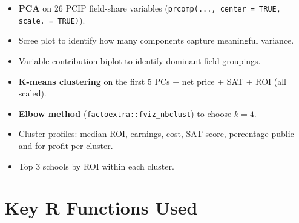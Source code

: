 \documentclass[12pt, letterpaper]{article}
\begin{document}
\begin{itemize}
  \item \textbf{PCA} on 26 PCIP field-share variables (\texttt{prcomp(..., center = TRUE, scale. = TRUE)}).
  \item Scree plot to identify how many components capture meaningful variance.
  \item Variable contribution biplot to identify dominant field groupings.
  \item \textbf{K-means clustering} on the first 5 PCs + net price + SAT + ROI (all scaled).
  \item \textbf{Elbow method} (\texttt{factoextra::fviz\_nbclust}) to choose $k = 4$.
  \item Cluster profiles: median ROI, earnings, cost, SAT score, percentage public and for-profit per cluster.
  \item Top 3 schools by ROI within each cluster.
\end{itemize}

\section{Key R Functions Used}
\end{document}
